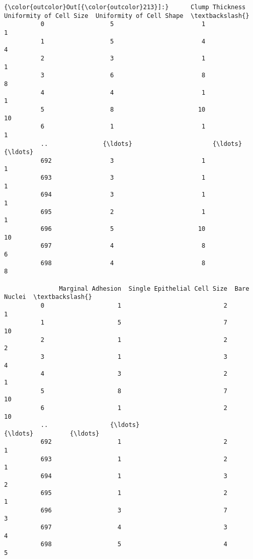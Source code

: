 \documentclass[11pt]{article}
\begin{document}
\begin{Verbatim}[commandchars=\\\{\}]
{\color{outcolor}Out[{\color{outcolor}213}]:}      Clump Thickness  Uniformity of Cell Size  Uniformity of Cell Shape  \textbackslash{}
          0                  5                        1                         1   
          1                  5                        4                         4   
          2                  3                        1                         1   
          3                  6                        8                         8   
          4                  4                        1                         1   
          5                  8                       10                        10   
          6                  1                        1                         1   
          ..               {\ldots}                      {\ldots}                       {\ldots}   
          692                3                        1                         1   
          693                3                        1                         1   
          694                3                        1                         1   
          695                2                        1                         1   
          696                5                       10                        10   
          697                4                        8                         6   
          698                4                        8                         8   
          
               Marginal Adhesion  Single Epithelial Cell Size  Bare Nuclei  \textbackslash{}
          0                    1                            2            1   
          1                    5                            7           10   
          2                    1                            2            2   
          3                    1                            3            4   
          4                    3                            2            1   
          5                    8                            7           10   
          6                    1                            2           10   
          ..                 {\ldots}                          {\ldots}          {\ldots}   
          692                  1                            2            1   
          693                  1                            2            1   
          694                  1                            3            2   
          695                  1                            2            1   
          696                  3                            7            3   
          697                  4                            3            4   
          698                  5                            4            5   
          

\end{Verbatim}
\end{document}
